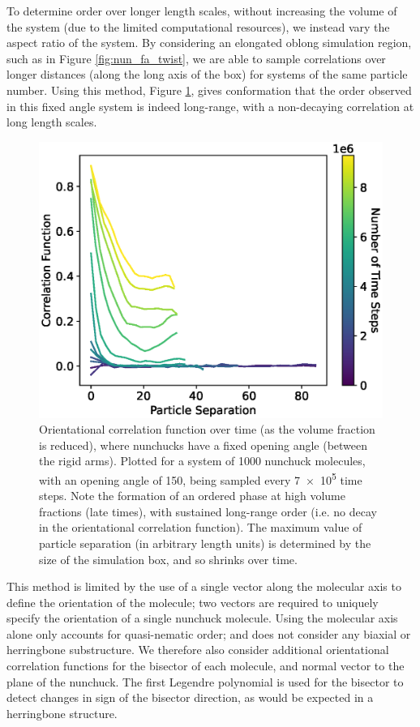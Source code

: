 \documentclass[11pt, a4paper]{article} %
\begin{document}
To determine order over longer length scales, without increasing the volume of the system (due to the limited computational resources), we instead vary the aspect ratio of the system. By considering an elongated oblong simulation region, such as in Figure \ref{fig:nun_fa_twist}, we are able to sample correlations over longer distances (along the long axis of the box) for systems of the same particle number. Using this method, Figure \ref{fig:num_fa_correlation_mol}, gives conformation that the order observed in this fixed angle system is indeed long-range, with a non-decaying correlation at long length scales.

\begin{figure} [h!]
	\centering
	\includegraphics[width=0.7\linewidth]{Figures/num_fa_correlation_mol}
	\caption{Orientational correlation function over time (as the volume fraction is reduced), where nunchucks have a fixed opening angle (between the rigid arms). Plotted for a system of \num{1000} nunchuck molecules, with an opening angle of \SI{150}{\deg}, being sampled every \num{7e5} time steps. Note the formation of an ordered phase at high volume fractions (late times), with sustained long-range order (i.e. no decay in the orientational correlation function). The maximum value of particle separation (in arbitrary length units) is determined by the size of the simulation box, and so shrinks over time.}
	\label{fig:num_fa_correlation_mol}
\end{figure}  %


This method is limited by the use of a single vector along the molecular axis to define the orientation of the molecule; two vectors are required to uniquely specify the orientation of a single nunchuck molecule. Using the molecular axis alone only accounts for quasi-nematic order; and does not consider any biaxial or herringbone substructure. We therefore also consider additional orientational correlation functions for the bisector of each molecule, and normal vector to the plane of the nunchuck. The first Legendre polynomial is used for the bisector to detect changes in sign of the bisector direction, as would be expected in a herringbone structure.
\end{document}
